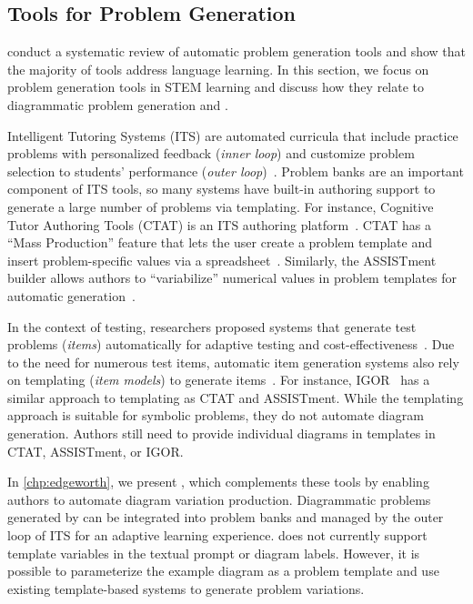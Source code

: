 \subsection{Tools for Problem Generation}
\label{sec:problem-generation}

\citet{kurdi_systematic_2020} conduct a systematic review of automatic problem generation tools and show that the majority of tools address language learning. In this section, we focus on problem generation tools in STEM learning and discuss how they relate to diagrammatic problem generation and \Edgeworth. 

Intelligent Tutoring Systems (ITS) are automated curricula that include practice problems with personalized feedback (\emph{inner loop}) and customize problem selection to students' performance (\emph{outer loop})~\cite{vanlehn_behavior_2006}. Problem banks are an important component of ITS tools, so many systems have built-in authoring support to generate a large number of problems via templating. For instance, Cognitive Tutor Authoring Tools (CTAT) is an ITS authoring platform~\cite{aleven_cognitive_2006}. CTAT has a ``Mass Production'' feature that lets the user create a problem template and insert problem-specific values via a spreadsheet~\cite{aleven_rapid_2006}. Similarly, the ASSISTment builder allows authors to ``variabilize'' numerical values in problem templates for automatic generation~\cite{ASSISTment}.  

In the context of testing, researchers proposed systems that generate test problems (\emph{items}) automatically for adaptive testing and cost-effectiveness~\cite{gierl2012automatic}.  Due to the need for numerous test items, automatic item generation systems also rely on templating (\emph{item models}) to generate items~\cite{gierl_role_2012,HOLLING200971,CheckIt}. For instance, IGOR~\cite[Chapter~13]{gierl2012automatic} has a similar approach to templating as CTAT and ASSISTment. While the templating approach is suitable for symbolic problems, they do not automate diagram generation. Authors still need to provide individual diagrams in templates in CTAT, ASSISTment, or IGOR. 

In \cref{chp:edgeworth}, we present \Edgeworth, which complements these tools by enabling authors to automate diagram variation production. Diagrammatic problems generated by \Edgeworth can be integrated into problem banks and managed by the outer loop of ITS for an adaptive learning experience. \Edgeworth does not currently support template variables in the textual prompt or diagram labels. However, it is possible to parameterize the example diagram as a problem template and use existing template-based systems to generate problem variations. 

